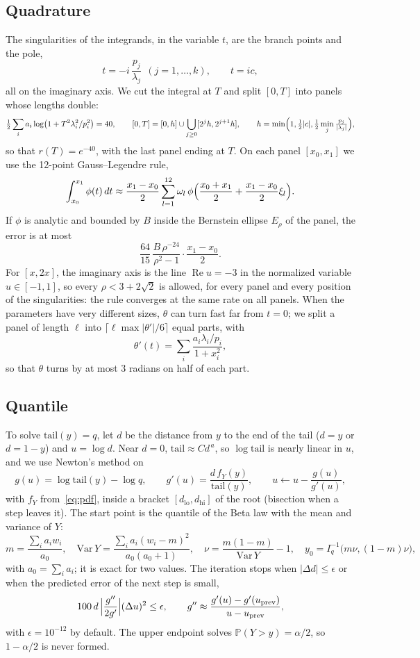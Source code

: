 \documentclass[11pt]{article}
\newcommand{\Pp}{\mathbb{P}}
\begin{document}
\subsection{Quadrature}

The singularities of the integrands, in the variable $t$, are the branch points and the pole,
\[
  t = -i\,\frac{p_j}{\lambda_j} \ \ (j = 1, \dots, k), \qquad t = i c,
\]
all on the imaginary axis.
We cut the integral at $T$ and split $[0, T]$ into panels whose lengths double:
\[
  \tfrac12\sum_i a_i \log\bigl(1 + T^2\lambda_i^2/p_i^2\bigr) = 40, \qquad
  [0, T] = [0, h] \cup \bigcup_{j \ge 0} [2^j h, 2^{j+1} h], \qquad
  h = \min\Bigl(1, \tfrac12 |c|, \tfrac12 \min_j \tfrac{p_j}{|\lambda_j|}\Bigr),
\]
so that $r(T) = e^{-40}$, with the last panel ending at $T$.
On each panel $[x_0, x_1]$ we use the 12-point Gauss--Legendre rule,
\[
  \int_{x_0}^{x_1} \phi(t)\,dt \approx \frac{x_1 - x_0}{2} \sum_{l=1}^{12} \omega_l\, \phi\Bigl(\frac{x_0 + x_1}{2} + \frac{x_1 - x_0}{2}\xi_l\Bigr).
\]
If $\phi$ is analytic and bounded by $B$ inside the Bernstein ellipse $E_\rho$ of the panel, the error is at most \cite[Thm.~19.3]{trefethen2013}
\[
  \frac{64}{15}\, \frac{B\, \rho^{-24}}{\rho^2 - 1}\cdot\frac{x_1 - x_0}{2} .
\]
For $[x, 2x]$, the imaginary axis is the line $\operatorname{Re} u = -3$ in the normalized variable $u \in [-1, 1]$, so every $\rho < 3 + 2\sqrt 2$ is allowed, for every panel and every position of the singularities: the rule converges at the same rate on all panels.
When the parameters have very different sizes, $\theta$ can turn fast far from $t = 0$; we split a panel of length $\ell$ into $\lceil \ell \max|\theta'| / 6 \rceil$ equal parts, with
\[
  \theta'(t) = \sum_i \frac{a_i \lambda_i/p_i}{1 + x_i^2} ,
\]
so that $\theta$ turns by at most $3$ radians on half of each part.

\subsection{Quantile}\label{sec:quantile}

To solve $\mathrm{tail}(y) = q$, let $d$ be the distance from $y$ to the end of the tail ($d = y$ or $d = 1 - y$) and $u = \log d$.
Near $d = 0$, $\mathrm{tail} \approx C d^{\,a}$, so $\log \mathrm{tail}$ is nearly linear in $u$, and we use Newton's method on
\[
  g(u) = \log \mathrm{tail}(y) - \log q, \qquad g'(u) = \frac{d\, f_Y(y)}{\mathrm{tail}(y)}, \qquad u \leftarrow u - \frac{g(u)}{g'(u)},
\]
with $f_Y$ from~\eqref{eq:pdf}, inside a bracket $[d_{\mathrm{lo}}, d_{\mathrm{hi}}]$ of the root (bisection when a step leaves it).
The start point is the quantile of the Beta law with the mean and variance of $Y$:
\[
  m = \frac{\sum_i a_i w_i}{a_0}, \quad
  \mathrm{Var}\,Y = \frac{\sum_i a_i (w_i - m)^2}{a_0(a_0 + 1)}, \quad
  \nu = \frac{m(1-m)}{\mathrm{Var}\,Y} - 1, \quad
  y_0 = I^{-1}_q\bigl(m\nu, (1 - m)\nu\bigr),
\]
with $a_0 = \sum_i a_i$; it is exact for two values.
The iteration stops when $|\Delta d| \le \epsilon$ or when the predicted error of the next step is small,
\[
  100\, d \,\Bigl|\frac{g''}{2g'}\Bigr| (\Delta u)^2 \le \epsilon, \qquad g'' \approx \frac{g'(u) - g'(u_{\mathrm{prev}})}{u - u_{\mathrm{prev}}},
\]
with $\epsilon = 10^{-12}$ by default.
The upper endpoint solves $\Pp(Y > y) = \alpha/2$, so $1 - \alpha/2$ is never formed.
\end{document}
